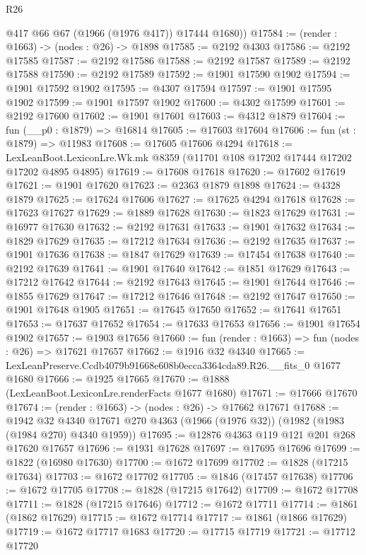 \begin{lexlean}{R26}
\begin{coremodule}
        @417
        @66
        @67
        (@1966 (@1976 @417))
        @17444
        @1680))
@17584 := (render : @1663) -> (nodes : @26) -> @1898
@17585 := @2192 @4303
@17586 := @2192 @17585
@17587 := @2192 @17586
@17588 := @2192 @17587
@17589 := @2192 @17588
@17590 := @2192 @17589
@17592 := @1901 @17590 @1902
@17594 := @1901 @17592 @1902
@17595 := @4307 @17594
@17597 := @1901 @17595 @1902
@17599 := @1901 @17597 @1902
@17600 := @4302 @17599
@17601 := @2192 @17600
@17602 := @1901 @17601
@17603 := @4312 @1879
@17604 := fun (__p0 : @1879) => @16814
@17605 := @17603 @17604
@17606 := fun (st : @1879) => @11983
@17608 := @17605 @17606 @4294
@17618 := LexLeanBoot.LexiconLre.Wk.mk @8359 (@11701 @108 @17202 @17444 @17202 @17202 @4895 @4895)
@17619 := @17608 @17618
@17620 := @17602 @17619
@17621 := @1901 @17620
@17623 := @2363 @1879 @1898
@17624 := @4328 @1879
@17625 := @17624 @17606
@17627 := @17625 @4294 @17618
@17628 := @17623 @17627
@17629 := @1889 @17628
@17630 := @1823 @17629
@17631 := @16977 @17630
@17632 := @2192 @17631
@17633 := @1901 @17632
@17634 := @1829 @17629
@17635 := @17212 @17634
@17636 := @2192 @17635
@17637 := @1901 @17636
@17638 := @1847 @17629
@17639 := @17454 @17638
@17640 := @2192 @17639
@17641 := @1901 @17640
@17642 := @1851 @17629
@17643 := @17212 @17642
@17644 := @2192 @17643
@17645 := @1901 @17644
@17646 := @1855 @17629
@17647 := @17212 @17646
@17648 := @2192 @17647
@17650 := @1901 @17648 @1905
@17651 := @17645 @17650
@17652 := @17641 @17651
@17653 := @17637 @17652
@17654 := @17633 @17653
@17656 := @1901 @17654 @1902
@17657 := @1903 @17656
@17660 := fun (render : @1663) => fun (nodes : @26) => @17621 @17657
@17662 := @1916 @32 @4340
@17665 := LexLeanPreserve.Ccdb4079b91668e608b0ecca3364cda89.R26.__fits_0 @1677 @1680
@17666 := @1925 @17665
@17670 := @1888 (LexLeanBoot.LexiconLre.renderFacts @1677 @1680)
@17671 := @17666 @17670
@17674 := (render : @1663) -> (nodes : @26) -> @17662 @17671
@17688 := @1942
    @32
    @4340
    @17671
    @270
    @4363
    (@1966 (@1976 @32))
    (@1982 (@1983 (@1984 @270) @4340 @1959))
@17695 := @12876 @4363 @119 @121 @201 @268 @17620 @17657
@17696 := @1931 @17628
@17697 := @17695 @17696
@17699 := @1822 (@16980 @17630)
@17700 := @1672 @17699
@17702 := @1828 (@17215 @17634)
@17703 := @1672 @17702
@17705 := @1846 (@17457 @17638)
@17706 := @1672 @17705
@17708 := @1828 (@17215 @17642)
@17709 := @1672 @17708
@17711 := @1828 (@17215 @17646)
@17712 := @1672 @17711
@17714 := @1861 (@1862 @17629)
@17715 := @1672 @17714
@17717 := @1861 (@1866 @17629)
@17719 := @1672 @17717 @1683
@17720 := @17715 @17719
@17721 := @17712 @17720

\end{coremodule}
\end{lexlean}
